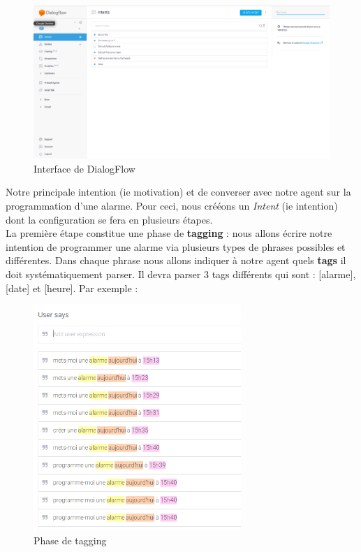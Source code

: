 \begin{figure}[H]
    \centering
        \centering
        \includegraphics[width=1\textwidth]{images/dialogflow.png}
        \caption{Interface de DialogFlow}
\end{figure}

Notre principale intention (ie motivation) et de converser avec notre agent sur la programmation d'une alarme. Pour ceci, nous crééons un \emph{Intent} (ie intention) dont 
la configuration se fera en plusieurs étapes.\\

La première étape constitue une phase de \textbf{tagging} : nous allons écrire notre intention de programmer une alarme via plusieurs types de phrases possibles et différentes.
Dans chaque phrase nous allons indiquer à notre agent quels \textbf{tags} il doit systématiquement parser. Il devra parser 3 tags différents qui sont : [alarme], [date] et 
[heure]. Par exemple :

\begin{figure}[H]
    \centering
        \centering
        \includegraphics[width=0.7\textwidth]{images/intents.png}
        \caption{Phase de tagging}
\end{figure}

